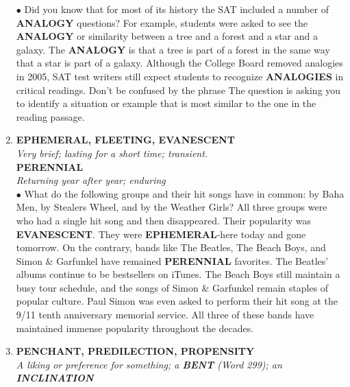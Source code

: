 \documentclass{book}
\begin{document}
\begin{enumerate}
$\bullet$ Did you know that for most of its history the SAT included a number of \textbf{ANALOGY} questions? For example, students were asked to see the \textbf{ANALOGY} or similarity between a tree and a forest and a star and a galaxy. The \textbf{ANALOGY} is that a tree is part of a forest in the same way that a star is part of a galaxy. Although the College Board removed analogies in 2005, SAT test writers still expect students to recognize \textbf{ANALOGIES} in critical readings. Don't be confused by the phrase  The question is asking you to identify a situation or example that is most similar to the one in the reading passage.

\item \textbf{EPHEMERAL, FLEETING, EVANESCENT}\\ 
\textit{Very brief; lasting for a short time; transient.}\\ 

\textbf{PERENNIAL}\\
\textit{ Returning year after year; enduring}\\

$\bullet$ What do the following groups and their hit songs have in common:  by Baha Men,  by Stealers Wheel, and  by the Weather Girls? All three groups were  who had a single hit song and then disappeared. Their popularity was \textbf{EVANESCENT}. They were \textbf{EPHEMERAL}-here today and gone tomorrow. On the contrary, bands like The Beatles, The Beach Boys, and Simon \& Garfunkel have remained \textbf{PERENNIAL} favorites. The Beatles' albums continue to be bestsellers on iTunes. The Beach Boys still maintain a busy tour schedule, and the songs of Simon \& Garfunkel remain staples of popular culture. Paul Simon was even asked to perform their hit song  at the 9/11 tenth anniversary memorial service. All three of these bands have maintained immense popularity throughout the decades.

\item \textbf{PENCHANT, PREDILECTION, PROPENSITY}\\
\textit{ A liking or preference for something; a \textbf{BENT} (Word 299); an \textbf{INCLINATION}}\\


\end{enumerate}
\end{document}
